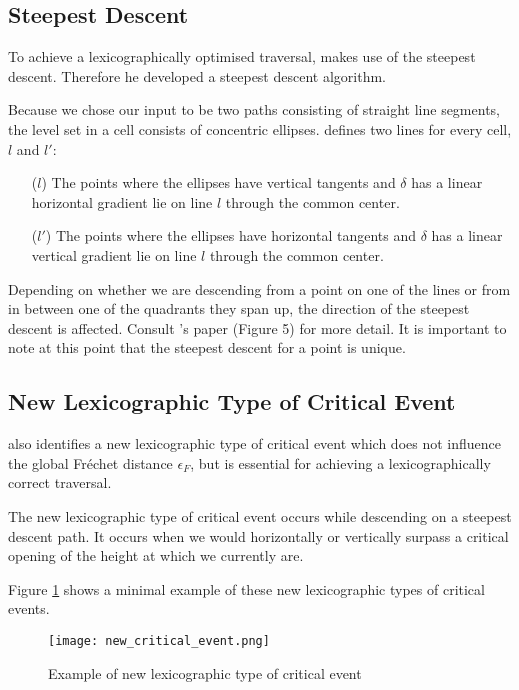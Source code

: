 \subsection{Steepest Descent}

To achieve a lexicographically optimised traversal, \citeauthor{rotelex} makes use of the steepest descent. Therefore he developed a steepest descent algorithm.

Because we chose our input to be two paths consisting of straight line segments, the level set in a cell consists of concentric ellipses. \citeauthor{rotelex} defines two lines for every cell, $l$ and $l'$:

\begin{itemize}
	\item [($l$)] The points where the ellipses have vertical tangents and $\delta$ has a linear horizontal gradient lie on line $l$ through the common center.\cite{rotelex}
	\item [($l'$)] The points where the ellipses have horizontal tangents and $\delta$ has a linear vertical gradient lie on line $l$ through the common center.\cite{rotelex}
\end{itemize}

Depending on whether we are descending from a point on one of the lines or from in between one of the quadrants they span up, the direction of the steepest descent is affected. Consult \citeauthor{rotelex}'s paper \cite{rotelex} (Figure 5) for more detail. It is important to note at this point that the steepest descent for a point is unique.


\subsection{New Lexicographic Type of Critical Event}

\citeauthor{rotelex} also identifies a new lexicographic type of critical event which does not influence the global Fréchet distance $\epsilon_F$, but is essential for achieving a lexicographically correct traversal.

The new lexicographic type of critical event occurs while descending on a steepest descent path. It occurs when we would horizontally or vertically surpass a critical opening of the height at which we currently are.

Figure \ref{fig:new_critical_event} shows a minimal example of these new lexicographic types of critical events.

\begin{figure}[H]
    \centering
    
	\texttt{[image: new\_critical\_event.png]}
	
	\caption{Example of new lexicographic type of critical event\protect\footnotemark}
    \label{fig:new_critical_event}
\end{figure}


